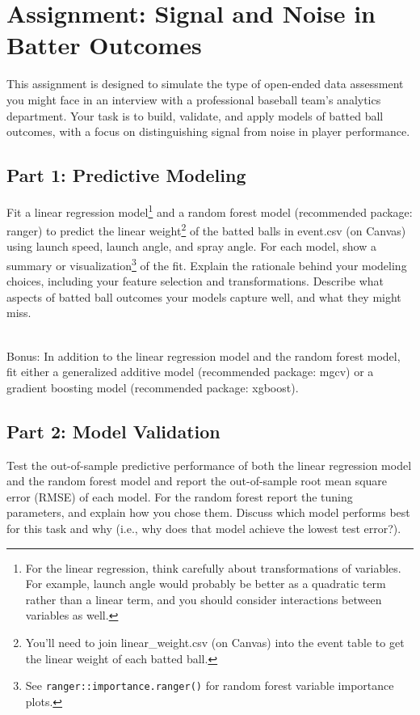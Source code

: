 \documentclass{article}
\begin{document}
  \section*{\sc Assignment: Signal and Noise in Batter Outcomes}

    This assignment is designed to simulate the type of open-ended data assessment you might face in an interview with a professional baseball team's analytics department. Your task is to build, validate, and apply models of batted ball outcomes, with a focus on distinguishing signal from noise in player performance.

    \subsection*{\sc Part 1: Predictive Modeling}

      Fit a linear regression model\footnote{For the linear regression, think carefully about transformations of variables. For example, launch angle would probably be better as a quadratic term rather than a linear term, and you should consider interactions between variables as well.} and a random forest model (recommended package: ranger) to predict the linear weight\footnote{You'll need to join linear\_weight.csv (on Canvas) into the event table to get the linear weight of each batted ball.} of the batted balls in event.csv (on Canvas) using launch speed, launch angle, and spray angle. For each model, show a summary or visualization\footnote{See \texttt{ranger::importance.ranger()} for random forest variable importance plots.} of the fit. Explain the rationale behind your modeling choices, including your feature selection and transformations. Describe what aspects of batted ball outcomes your models capture well, and what they might miss.

      ~\\
      {\sc Bonus:} In addition to the linear regression model and the random forest model, fit either a generalized additive model (recommended package: mgcv) or a gradient boosting model (recommended package: xgboost).

    \subsection*{\sc Part 2: Model Validation}

      Test the out-of-sample predictive performance of both the linear regression model and the random forest model and report the out-of-sample root mean square error (RMSE) of each model. For the random forest report the tuning parameters, and explain how you chose them. Discuss which model performs best for this task and why (i.e., why does that model achieve the lowest test error?).
\end{document}
